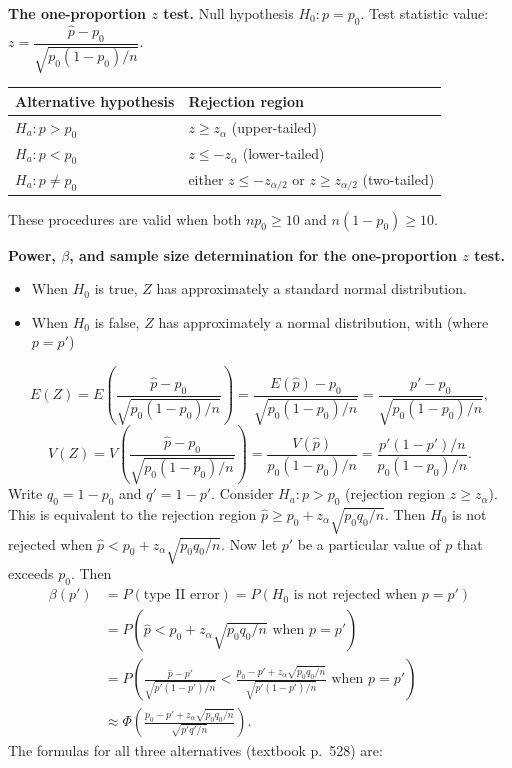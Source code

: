 \textbf{The one-proportion $z$ test.}
Null hypothesis $H_0:p=p_0$. Test statistic value: $z=\dfrac{\hat{p}-p_0}{\sqrt{p_0(1-p_0)/n}}$.

\begin{center}
\begin{tabular}{ll}
\toprule
Alternative hypothesis & Rejection region\\
\midrule
$H_a:p>p_0$   & $z\ge z_\alpha$ (upper-tailed)\\
$H_a:p<p_0$   & $z\le -z_\alpha$ (lower-tailed)\\
$H_a:p\ne p_0$ & either $z\le -z_{\alpha/2}$ or $z\ge z_{\alpha/2}$ (two-tailed)\\
\bottomrule
\end{tabular}
\end{center}
These procedures are valid when both $np_0\ge 10$ and $n(1-p_0)\ge 10$.

\textbf{Power, $\beta$, and sample size determination for the one-proportion $z$ test.}
\begin{itemize}
  \item When $H_0$ is true, $Z$ has approximately a standard normal distribution.
  \item When $H_0$ is false, $Z$ has approximately a normal distribution, with (where $p=p'$)
\end{itemize}
\[
E(Z) = E\!\left(\frac{\hat{p}-p_0}{\sqrt{p_0(1-p_0)/n}}\right) = \frac{E(\hat{p})-p_0}{\sqrt{p_0(1-p_0)/n}} = \frac{p'-p_0}{\sqrt{p_0(1-p_0)/n}},
\]
\[
V(Z) = V\!\left(\frac{\hat{p}-p_0}{\sqrt{p_0(1-p_0)/n}}\right) = \frac{V(\hat{p})}{p_0(1-p_0)/n} = \frac{p'(1-p')/n}{p_0(1-p_0)/n}.
\]
Write $q_0=1-p_0$ and $q'=1-p'$. Consider $H_a:p>p_0$ (rejection region $z\ge z_\alpha$). This is equivalent to the rejection region
$\hat{p}\ge p_0+z_\alpha\sqrt{p_0q_0/n}$. Then $H_0$ is not rejected when $\hat{p}<p_0+z_\alpha\sqrt{p_0q_0/n}$.
Now let $p'$ be a particular value of $p$ that exceeds $p_0$. Then
\begin{align*}
\beta(p') &= P(\text{type II error}) = P(H_0 \text{ is not rejected when } p=p')\\
&= P\!\left(\hat{p}<p_0+z_\alpha\sqrt{p_0q_0/n} \text{ when } p=p'\right)\\
&= P\!\left(\frac{\hat{p}-p'}{\sqrt{p'(1-p')/n}} < \frac{p_0-p'+z_\alpha\sqrt{p_0q_0/n}}{\sqrt{p'(1-p')/n}} \text{ when } p=p'\right)\\
&\approx \Phi\!\left(\frac{p_0-p'+z_\alpha\sqrt{p_0q_0/n}}{\sqrt{p'q'/n}}\right).
\end{align*}
The formulas for all three alternatives (textbook p.~528) are:

